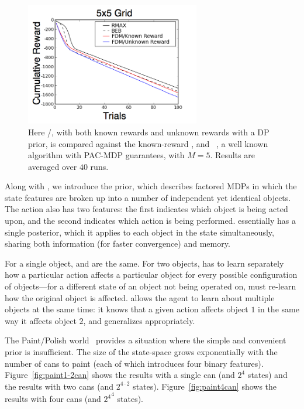 \begin{figure}
\vskip 0.2in
\begin{center}
\centerline{\includegraphics[width=3in]{grids}}
\caption{
Here /, with both known rewards and unknown rewards with a DP prior, is compared against the known-reward , and ~\cite{brafman02}, a well known algorithm with PAC-MDP guarantees, with $M=5$. Results are averaged over $40$ runs.
}
\label{fig:grids}
\end{center}
\vskip -0.2in
\end{figure} 

Along with , we introduce the  prior, which describes factored MDPs in which the state features are broken up into a number of independent yet identical objects. The action also has two features: the first indicates which object is being acted upon, and the second indicates which action is being performed.  essentially has a single  posterior, which it applies to each object in the state simultaneously, sharing both information (for faster convergence) and memory.


For a single object,  and  are the same. For two objects,  has to learn separately how a particular action affects a particular object for every possible configuration of objects---for a different state of an object not being operated on,  must re-learn how the original object is affected.  allows the agent to learn about multiple objects at the same time: it knows that a given action affects object $1$ in the same way it affects object $2$, and generalizes appropriately.

The Paint/Polish world~\cite{walsh09a} provides a situation where the simple and convenient  prior is insufficient. The size of the state-space grows exponentially with the number of cans to paint (each of which introduces four binary features). Figure~\ref{fig:paint1-2can} shows the results with a single can (and $2^4$ states) and the results with two cans (and $2^{4\cdot 2}$ states). Figure~\ref{fig:paint4can} shows the results with four cans (and ${2^4}^4$ states).


